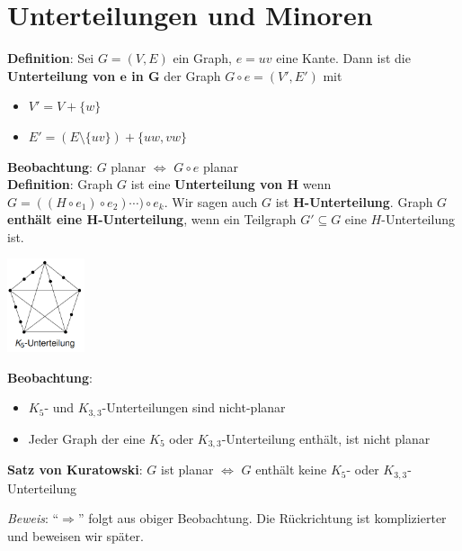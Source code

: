 \section{Unterteilungen und Minoren}

\textbf{Definition}: Sei $G=(V,E)$ ein Graph, $e=uv$ eine Kante. Dann ist die \textbf{Unterteilung von $\boldsymbol{e}$ in $\boldsymbol{G}$} der Graph $G\circ e=(V',E')$ mit
\begin{itemize}
	\item $V'=V+\{w\}$
	\item $E'=(E\setminus \{uv\})+\{uw,vw\}$
\end{itemize}
\bigskip
\textbf{Beobachtung}: $G$ planar $\iff$ $G\circ e$ planar\\

\textbf{Definition}: Graph $G$ ist eine \textbf{Unterteilung von $\boldsymbol{H}$} wenn $G=((H \circ e_1)\circ e_2)\cdots)\circ e_k$.
Wir sagen auch $G$ ist $\boldsymbol{H}$\textbf{-Unterteilung}.
Graph $G$ \textbf{enthält eine $\boldsymbol{H}$-Unterteilung}, wenn ein Teilgraph $G'\subseteq G$ eine $H$-Unterteilung ist.

\begin{center}
	\includegraphics[width=0.17\textwidth]{images/k5-unterteilung.png}
\end{center}

\textbf{Beobachtung}: 
\begin{itemize}
	\item $K_5$- und $K_{3,3}$-Unterteilungen sind nicht-planar
	\item Jeder Graph der eine $K_5$ oder $K_{3,3}$-Unterteilung enthält, ist nicht planar
\end{itemize}
\bigskip
\textbf{Satz von Kuratowski}: $G$ ist planar $\iff$ $G$ enthält keine $K_5$- oder $K_{3,3}$-Unterteilung

\textit{Beweis}: \enquote{$\Rightarrow$} folgt aus obiger Beobachtung. Die Rückrichtung ist komplizierter und beweisen wir später.\\

